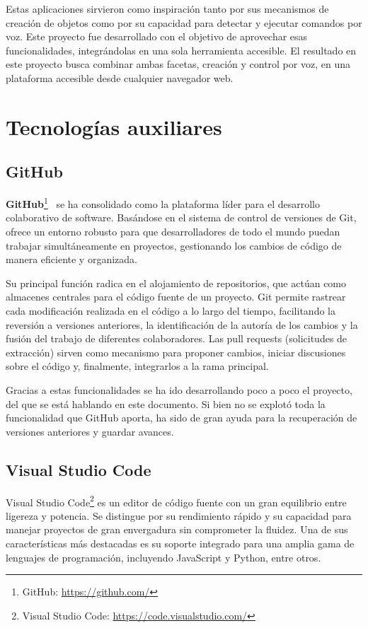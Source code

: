 \documentclass[a4paper, 12pt]{book}
\begin{document}
Estas aplicaciones sirvieron como inspiración tanto por sus mecanismos de creación de objetos como por su capacidad para detectar y ejecutar comandos por voz.
Este proyecto fue desarrollado con el objetivo de aprovechar esas funcionalidades, integrándolas en una sola herramienta accesible.
El resultado en este proyecto busca combinar ambas facetas, creación y control por voz, en una plataforma accesible desde cualquier navegador web.


\section{Tecnologías auxiliares}
\subsection{GitHub}
\textbf{GitHub}\footnote{GitHub: \url{https://github.com/}}~\cite{github-docs-git} se ha consolidado como la plataforma líder para el desarrollo colaborativo de software.
Basándose en el sistema de control de versiones de Git, ofrece un entorno robusto para que desarrolladores de todo el mundo puedan trabajar simultáneamente en proyectos, gestionando los cambios de código de manera eficiente y organizada.

Su principal función radica en el alojamiento de repositorios, que actúan como almacenes centrales para el código fuente de un proyecto. Git permite rastrear cada modificación realizada en el código a lo largo del tiempo, facilitando la reversión a versiones anteriores, la identificación de la autoría de los cambios y la fusión del trabajo de diferentes colaboradores.
Las pull requests (solicitudes de extracción) sirven como mecanismo para proponer cambios, iniciar discusiones sobre el código y, finalmente, integrarlos a la rama principal.

Gracias a estas funcionalidades se ha ido desarrollando poco a poco el proyecto, del que se está hablando en este documento. Si bien no se explotó toda la funcionalidad que GitHub aporta, ha sido de gran ayuda para la recuperación de versiones anteriores y guardar avances.
\subsection{Visual Studio Code}
Visual Studio Code\footnote{Visual Studio Code: \scriptsize\url{https://code.visualstudio.com/}}\cite{vscode-docs} es un editor de código fuente con un gran equilibrio entre ligereza y potencia. Se distingue por su rendimiento rápido y su capacidad para manejar proyectos de gran envergadura sin comprometer la fluidez.
Una de sus características más destacadas es su soporte integrado para una amplia gama de lenguajes de programación, incluyendo JavaScript y Python, entre otros.
\end{document}
